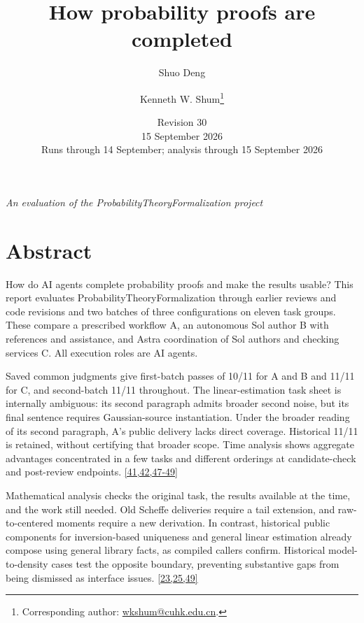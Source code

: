 
\title{How probability proofs are completed}
\author{Shuo Deng \and Kenneth W. Shum\thanks{Corresponding author: \href{mailto:wkshum@cuhk.edu.cn}{wkshum@cuhk.edu.cn}.}}\date{Revision 30\\15 September 2026\\Runs through 14 September; analysis through 15 September 2026}
\maketitle
\emph{An evaluation of the ProbabilityTheoryFormalization project}

\section*{\texorpdfstring{\protect\hypertarget{abstract}{}Abstract}{Abstract}}
How do AI agents complete probability proofs and make the results usable? This report evaluates ProbabilityTheoryFormalization through earlier reviews and code revisions and two batches of three configurations on eleven task groups. These compare a prescribed workflow A, an autonomous Sol author B with references and assistance, and Astra coordination of Sol authors and checking services C. All execution roles are AI agents.

Saved common judgments give first-batch passes of 10/11 for A and B and 11/11 for C, and second-batch 11/11 throughout. The linear-estimation task sheet is internally ambiguous: its second paragraph admits broader second noise, but its final sentence requires Gaussian-source instantiation. Under the broader reading of its second paragraph, A's public delivery lacks direct coverage. Historical 11/11 is retained, without certifying that broader scope. Time analysis shows aggregate advantages concentrated in a few tasks and different orderings at candidate-check and post-review endpoints. \hyperlink{ref-41}{\mbox{[41,42,47-49]}}

Mathematical analysis checks the original task, the results available at the time, and the work still needed. Old Scheffe deliveries require a tail extension, and raw-to-centered moments require a new derivation. In contrast, historical public components for inversion-based uniqueness and general linear estimation already compose using general library facts, as compiled callers confirm. Historical model-to-density cases test the opposite boundary, preventing substantive gaps from being dismissed as interface issues. \hyperlink{ref-23}{\mbox{[23,25,49]}}

